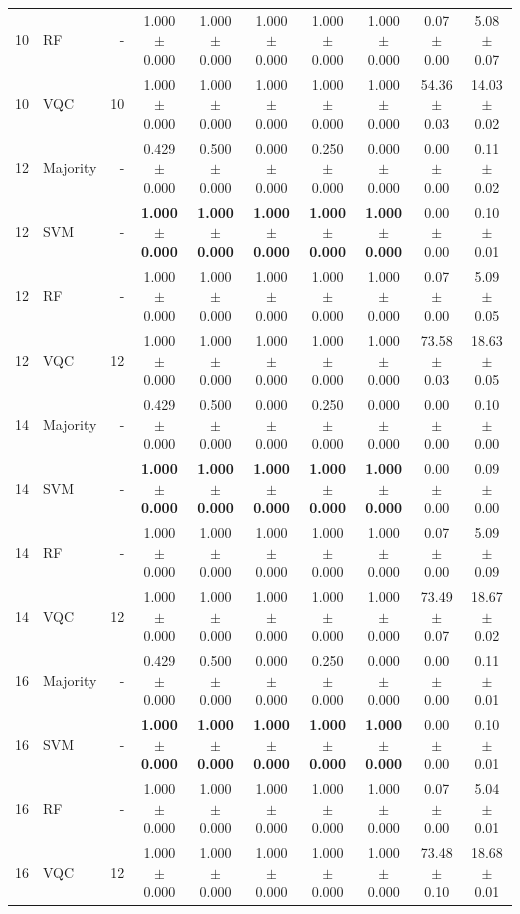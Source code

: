 \begin{tabular}{llrccccccc}
10 & RF & - & 1.000 $\pm$ 0.000 & 1.000 $\pm$ 0.000 & 1.000 $\pm$ 0.000 & 1.000 $\pm$ 0.000 & 1.000 $\pm$ 0.000 & 0.07 $\pm$ 0.00 & 5.08 $\pm$ 0.07 \\
10 & VQC & 10 & 1.000 $\pm$ 0.000 & 1.000 $\pm$ 0.000 & 1.000 $\pm$ 0.000 & 1.000 $\pm$ 0.000 & 1.000 $\pm$ 0.000 & 54.36 $\pm$ 0.03 & 14.03 $\pm$ 0.02 \\
\midrule
12 & Majority & - & 0.429 $\pm$ 0.000 & 0.500 $\pm$ 0.000 & 0.000 $\pm$ 0.000 & 0.250 $\pm$ 0.000 & 0.000 $\pm$ 0.000 & 0.00 $\pm$ 0.00 & 0.11 $\pm$ 0.02 \\
12 & SVM & - & \textbf{1.000 $\pm$ 0.000} & \textbf{1.000 $\pm$ 0.000} & \textbf{1.000 $\pm$ 0.000} & \textbf{1.000 $\pm$ 0.000} & \textbf{1.000 $\pm$ 0.000} & 0.00 $\pm$ 0.00 & 0.10 $\pm$ 0.01 \\
12 & RF & - & 1.000 $\pm$ 0.000 & 1.000 $\pm$ 0.000 & 1.000 $\pm$ 0.000 & 1.000 $\pm$ 0.000 & 1.000 $\pm$ 0.000 & 0.07 $\pm$ 0.00 & 5.09 $\pm$ 0.05 \\
12 & VQC & 12 & 1.000 $\pm$ 0.000 & 1.000 $\pm$ 0.000 & 1.000 $\pm$ 0.000 & 1.000 $\pm$ 0.000 & 1.000 $\pm$ 0.000 & 73.58 $\pm$ 0.03 & 18.63 $\pm$ 0.05 \\
\midrule
14 & Majority & - & 0.429 $\pm$ 0.000 & 0.500 $\pm$ 0.000 & 0.000 $\pm$ 0.000 & 0.250 $\pm$ 0.000 & 0.000 $\pm$ 0.000 & 0.00 $\pm$ 0.00 & 0.10 $\pm$ 0.00 \\
14 & SVM & - & \textbf{1.000 $\pm$ 0.000} & \textbf{1.000 $\pm$ 0.000} & \textbf{1.000 $\pm$ 0.000} & \textbf{1.000 $\pm$ 0.000} & \textbf{1.000 $\pm$ 0.000} & 0.00 $\pm$ 0.00 & 0.09 $\pm$ 0.00 \\
14 & RF & - & 1.000 $\pm$ 0.000 & 1.000 $\pm$ 0.000 & 1.000 $\pm$ 0.000 & 1.000 $\pm$ 0.000 & 1.000 $\pm$ 0.000 & 0.07 $\pm$ 0.00 & 5.09 $\pm$ 0.09 \\
14 & VQC & 12 & 1.000 $\pm$ 0.000 & 1.000 $\pm$ 0.000 & 1.000 $\pm$ 0.000 & 1.000 $\pm$ 0.000 & 1.000 $\pm$ 0.000 & 73.49 $\pm$ 0.07 & 18.67 $\pm$ 0.02 \\
\midrule
16 & Majority & - & 0.429 $\pm$ 0.000 & 0.500 $\pm$ 0.000 & 0.000 $\pm$ 0.000 & 0.250 $\pm$ 0.000 & 0.000 $\pm$ 0.000 & 0.00 $\pm$ 0.00 & 0.11 $\pm$ 0.01 \\
16 & SVM & - & \textbf{1.000 $\pm$ 0.000} & \textbf{1.000 $\pm$ 0.000} & \textbf{1.000 $\pm$ 0.000} & \textbf{1.000 $\pm$ 0.000} & \textbf{1.000 $\pm$ 0.000} & 0.00 $\pm$ 0.00 & 0.10 $\pm$ 0.01 \\
16 & RF & - & 1.000 $\pm$ 0.000 & 1.000 $\pm$ 0.000 & 1.000 $\pm$ 0.000 & 1.000 $\pm$ 0.000 & 1.000 $\pm$ 0.000 & 0.07 $\pm$ 0.00 & 5.04 $\pm$ 0.01 \\
16 & VQC & 12 & 1.000 $\pm$ 0.000 & 1.000 $\pm$ 0.000 & 1.000 $\pm$ 0.000 & 1.000 $\pm$ 0.000 & 1.000 $\pm$ 0.000 & 73.48 $\pm$ 0.10 & 18.68 $\pm$ 0.01 \\
\bottomrule
\end{tabular}